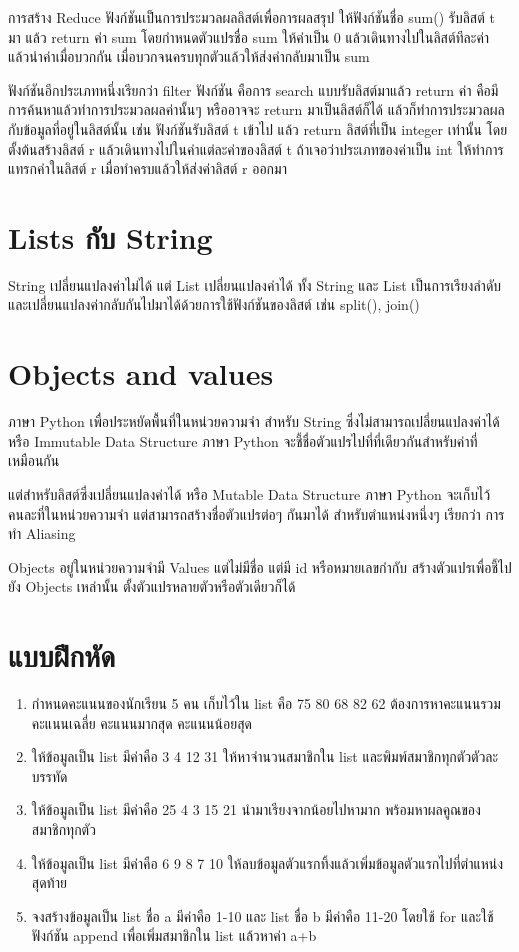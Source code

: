 การสร้าง Reduce ฟังก์ชันเป็นการประมวลผลลิสต์เพื่อการผลสรุป ให้ฟังก์ชันชื่อ sum() รับลิสต์ t มา แล้ว return ค่า sum โดยกำหนดตัวแปรชื่อ sum ให้ค่าเป็น 0 แล้วเดินทางไปในลิสต์ทีละค่า แล้วนำค่าเมื่อบวกกัน เมื่อบวกจนครบทุกตัวแล้วให้ส่งค่ากลับมาเป็น sum

ฟังก์ชันอีกประเภทหนึ่งเรียกว่า filter ฟังก์ชัน คือการ search แบบรับลิสต์มาแล้ว return ค่า คือมีการค้นหาแล้วทำการประมวลผลค่านั้นๆ หรืออาจจะ return มาเป็นลิสต์ก็ได้ แล้วก็ทำการประมวลผลกับข้อมูลที่อยู่ในลิสต์นั้น เช่น ฟังก์ชันรับลิสต์ t เข้าไป แล้ว return ลิสต์ที่เป็น integer เท่านั้น โดยตั้งต้นสร้างลิสต์ r แล้วเดินทางไปในค่าแต่ละค่าของลิสต์ t ถ้าเจอว่าประเภทของค่าเป็น int ให้ทำการแทรกค่าในลิสต์ r เมื่อทำครบแล้วให้ส่งค่าลิสต์ r ออกมา

\section{Lists กับ String}

String เปลี่ยนแปลงค่าไม่ได้ แต่ List เปลี่ยนแปลงค่าได้ ทั้ง String และ List เป็นการเรียงลำดับและเปลี่ยนแปลงค่ากลับกันไปมาได้ด้วยการใช้ฟังก์ชันของลิสต์ เช่น split(), join()

\section{Objects and values}

ภาษา Python เพื่อประหยัดพื้นที่ในหน่วยความจำ สำหรับ String ซึ่งไม่สามารถเปลี่ยนแปลงค่าได้ หรือ Immutable Data Structure ภาษา Python จะชี้ชื่อตัวแปรไปที่ที่เดียวกันสำหรับค่าที่เหมือนกัน 

แต่สำหรับลิสต์ซึ่งเปลี่ยนแปลงค่าได้ หรือ Mutable Data Structure ภาษา Python จะเก็บไว้คนละที่ในหน่วยความจำ แต่สามารถสร้างชื่อตัวแปรต่อๆ กันมาได้ สำหรับตำแหน่งหนึ่งๆ เรียกว่า การทำ Aliasing

Objects อยู่ในหน่วยความจำมี Values แต่ไม่มีชื่อ แต่มี id หรือหมายเลขกำกับ สร้างตัวแปรเพื่อชี้ไปยัง Objects เหล่านั้น ตั้งตัวแปรหลายตัวหรือตัวเดียวก็ได้

\section{แบบฝึกหัด}
\begin{enumerate} 
\item กำหนดคะแนนของนักเรียน 5 คน เก็บไว้ใน list คือ 75 80 68 82 62 ต้องการหาคะแนนรวม คะแนนเฉลี่ย คะแนนมากสุด คะแนนน้อยสุด 
\item ให้ข้อมูลเป็น list มีค่าคือ 3 4 12 31 ให้หาจำนวนสมาชิกใน list  และพิมพ์สมาชิกทุกตัวตัวละบรรทัด
\item ให้ข้อมูลเป็น list มีค่าคือ 25 4 3 15 21 นำมาเรียงจากน้อยไปหามาก พร้อมหาผลคูณของสมาชิกทุกตัว
\item ให้ข้อมูลเป็น list มีค่าคือ 6 9 8 7 10 ให้ลบข้อมูลตัวแรกทิ้งแล้วเพิ่มข้อมูลตัวแรกไปที่ตำแหน่งสุดท้าย
\item จงสร้างข้อมูลเป็น list ชื่อ a มีค่าคือ 1-10 และ list ชื่อ b มีค่าคือ 11-20 โดยใช้ for และใช้ฟังก์ชัน append เพื่อเพิ่มสมาชิกใน list แล้วหาค่า a+b
\end{enumerate}


